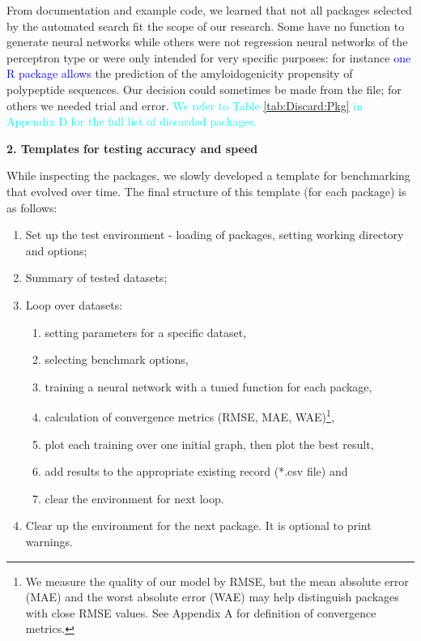 From documentation and example code, we learned that not all packages
selected by the automated search fit the scope of our research. Some
have no function to generate neural networks while others were not
regression neural networks of the perceptron type or were only intended
for very specific purposes: for instance
\textcolor{blue}{one \textsf{R} package allows }the prediction of the
amyloidogenicity propensity of polypeptide sequences. Our decision could
sometimes be made from the  file; for others we needed
trial and error.
\textcolor{cyan}{We refer to Table \ref{tab:Discard:Pkg} in Appendix D for the full list of discarded packages.}

\textbf{2. Templates for testing accuracy and speed}

While inspecting the packages, we slowly developed a template for
benchmarking that evolved over time. The final structure of this
template (for each package) is as follows:

\begin{enumerate}
\def\labelenumi{\arabic{enumi}.}
\tightlist
\item
  Set up the test environment - loading of packages, setting working
  directory and options;
\item
  Summary of tested datasets;
\item
  Loop over datasets:

  \begin{enumerate}
  \def\labelenumii{\alph{enumii}.}
  \tightlist
  \item
    setting parameters for a specific dataset,
  \item
    selecting benchmark options,
  \item
    training a neural network with a tuned function for each package,
  \item
    calculation of convergence metrics (RMSE, MAE, WAE)\footnote{We
      measure the quality of our model by RMSE, but the mean absolute
      error (MAE) and the worst absolute error (WAE) may help
      distinguish packages with close RMSE values. See Appendix A for
      definition of convergence metrics.},
  \item
    plot each training over one initial graph, then plot the best
    result,
  \item
    add results to the appropriate existing record (*.csv file) and
  \item
    clear the environment for next loop.
  \end{enumerate}
\item
  Clear up the environment for the next package. It is optional to print
  warnings.
\end{enumerate}

